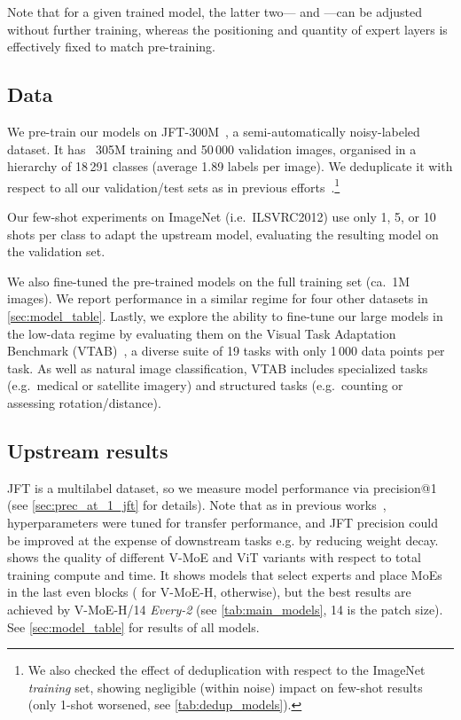 \documentclass{article}
\newcommand{\abbv}{{V-MoE}}
\begin{document}
Note that for a given trained model, the latter two--- and ---can be adjusted without further training, whereas the positioning and quantity of expert layers is effectively fixed to match pre-training.


\subsection{Data}\label{sect:data}
We pre-train our models on JFT-300M~\cite{sun2017revisiting}, a semi-automatically noisy-labeled dataset. 
It has ~305M training and 50\,000 validation images,
organised in a hierarchy of 18\,291 classes (average 1.89 labels per image). We deduplicate it with respect to all our validation/test sets as in previous efforts~\cite{kolesnikov2019big}.\footnote{We also checked the effect of deduplication with respect to the ImageNet \textit{training} set, showing negligible (within noise) impact on few-shot results (only 1-shot worsened, see \cref{tab:dedup_models}).}

Our few-shot experiments on ImageNet (i.e.\ ILSVRC2012) use only 1, 5, or 10 shots per class to adapt the upstream model, evaluating the resulting model on the validation set.

We also fine-tuned the pre-trained models on the full training set (ca.\ 1M images).
We report performance in a similar regime for four other datasets in
\cref{sec:model_table}. Lastly, we explore the ability to fine-tune our large models in the low-data regime by evaluating
them on the Visual Task Adaptation Benchmark (VTAB)~\cite{zhai2019largescale}, 
a diverse suite of 19 tasks with only 1\,000 data points per task.
As well as natural image classification, VTAB includes specialized tasks (e.g.\ medical or satellite imagery) and structured tasks 
(e.g.\ counting or assessing rotation/distance).


\subsection{Upstream results}
JFT is a multilabel dataset, so we measure model performance via precision@1 (see \cref{sec:prec_at_1_jft} for details). Note that as in previous works~\cite{dosovitskiy2020image}, hyperparameters were tuned for transfer performance, and JFT precision could be improved at the expense of downstream tasks e.g. by reducing weight decay.
 shows the quality of different \abbv{} and ViT variants with respect to total training compute and time.
It shows models that select  experts and place MoEs in the last  even blocks 
( for \abbv{}-H,  otherwise), but the best results are achieved by \abbv{}-H/14 \emph{Every-2} (see \cref{tab:main_models}, 14 is the patch size). 
See \cref{sec:model_table} for results of all models.
\end{document}
